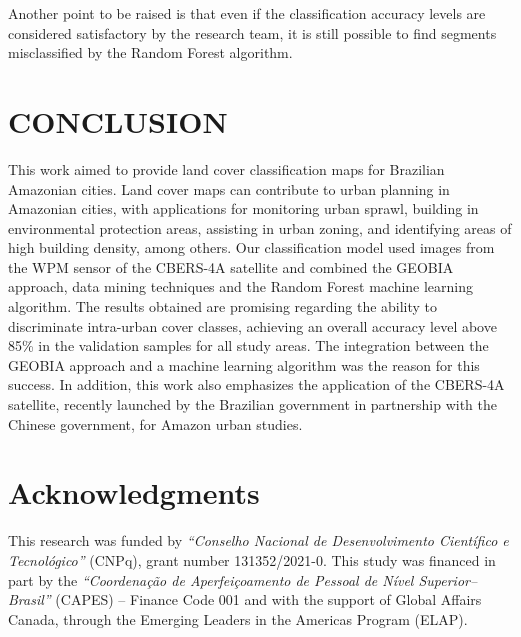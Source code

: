 \documentclass[preprint, 3p,
authoryear]{elsarticle} %
\begin{document}
Another point to be raised is that even if the classification accuracy
levels are considered satisfactory by the research team, it is still
possible to find segments misclassified by the Random Forest algorithm.

\hypertarget{conclusion}{%
\section{CONCLUSION}\label{conclusion}}

This work aimed to provide land cover classification maps for Brazilian
Amazonian cities. Land cover maps can contribute to urban planning in
Amazonian cities, with applications for monitoring urban sprawl,
building in environmental protection areas, assisting in urban zoning,
and identifying areas of high building density, among others. Our
classification model used images from the WPM sensor of the CBERS-4A
satellite and combined the GEOBIA approach, data mining techniques and
the Random Forest machine learning algorithm. The results obtained are
promising regarding the ability to discriminate intra-urban cover
classes, achieving an overall accuracy level above 85\% in the
validation samples for all study areas. The integration between the
GEOBIA approach and a machine learning algorithm was the reason for this
success. In addition, this work also emphasizes the application of the
CBERS-4A satellite, recently launched by the Brazilian government in
partnership with the Chinese government, for Amazon urban studies.

\hypertarget{acknowledgments}{%
\section{Acknowledgments}\label{acknowledgments}}

This research was funded by \emph{``Conselho Nacional de Desenvolvimento
Científico e Tecnológico''} (CNPq), grant number 131352/2021-0. This
study was financed in part by the \emph{``Coordenação de Aperfeiçoamento
de Pessoal de Nível Superior--Brasil''} (CAPES) -- Finance Code 001 and
with the support of Global Affairs Canada, through the Emerging Leaders
in the Americas Program (ELAP).


\end{document}
